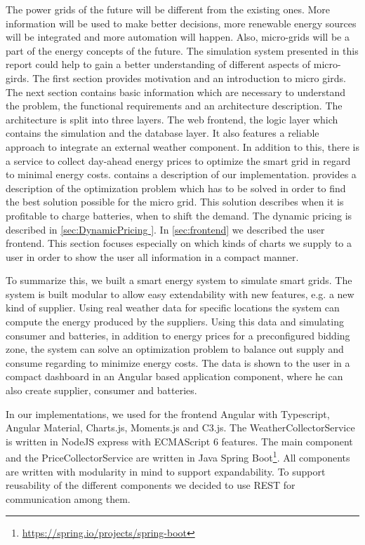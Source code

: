 The power grids of the future will be different from the existing ones. More information will be used to make better decisions, more renewable energy sources will be integrated and more automation will happen.
Also, micro-grids will be a part of the energy concepts of the future.
The simulation system presented in this report could help to gain a better understanding of different aspects of micro-girds. 
The first section provides motivation and an introduction to micro girds. 
The next section contains basic information which are necessary to understand the problem, the functional requirements and an architecture description.
The architecture is split into three layers. 
The web frontend, the logic layer which contains the simulation and the database layer.
It also features a reliable approach to integrate an external weather component.
In addition to this, there is a service to collect day-ahead energy prices to optimize the smart grid in regard to minimal energy costs. 
 contains a description of our implementation.
 provides a description of the optimization problem which has to be solved in order to find the best solution possible for the micro grid. 
This solution describes when it is profitable to charge batteries, when to shift the demand.
The dynamic pricing is described in \cref{sec:DynamicPricing }.
In \cref{sec:frontend} we described the user frontend. This section focuses especially on which kinds of charts we supply to a user in order to show the user all information in a compact manner. 

To summarize this, we built a smart energy system to simulate smart grids.
The system is built modular to allow easy extendability with new features, e.g. a new kind of supplier.
Using real weather data for specific locations the system can compute the energy produced by the suppliers.
Using this data and simulating consumer and batteries, in addition to energy prices for a preconfigured bidding zone, the system can solve an optimization problem to balance out supply and consume regarding to minimize energy costs.
The data is shown to the user in a compact dashboard in an Angular based application component, where he can also create supplier, consumer and batteries.

In our implementations, we used for the frontend Angular with Typescript, Angular Material, Charts.js, Moments.js and C3.js.
The WeatherCollectorService is written in NodeJS express with ECMAScript 6 features.
The main component and the PriceCollectorService are written in Java Spring Boot\footnote{\url{https://spring.io/projects/spring-boot}}.
All components are written with modularity in mind to support expandability. To support reusability of the different components we decided to use REST for communication among them.

